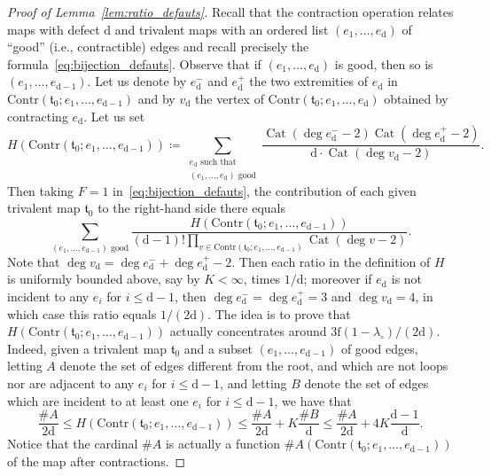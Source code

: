 \documentclass[11pt]{article}
\newcommand{\ie}{i.e.,\xspace}
\DeclareMathOperator{\Cat}{Cat}
\theoremstyle{plain}
\theoremstyle{definition}
\theoremstyle{remark}
\newcommand{\face}{\mathrm{f}}
\newcommand{\defect}{\mathrm{d}}
\begin{document}
\begin{proof}[Proof of Lemma~\ref{lem:ratio_defauts}]
Recall that the contraction operation relates maps with defect $\defect$ and trivalent maps with an ordered list $(e_1, \dots, e_\defect)$ of ``good'' (\ie contractible) edges and recall precisely the formula~\eqref{eq:bijection_defauts}.
Observe that if $(e_1, \dots, e_\defect)$ is good, then so is $(e_1, \dots, e_{\defect-1})$. Let us denote by $e_\defect^-$ and $e_\defect^+$ the two extremities of $e_\defect$ in $\mathrm{Contr}(\mathfrak{t}_0 ; e_1, \dots, e_{\defect-1})$ and by $v_\defect$ the vertex of $\mathrm{Contr}(\mathfrak{t}_0 ; e_1, \dots, e_\defect)$ obtained by contracting $e_\defect$.
Let us set
\[
H(\mathrm{Contr}(\mathfrak{t}_0 ; e_1, \dots, e_{ \defect-1}))
\coloneqq \sum_{\substack{e_\defect \text{ such that}\\ (e_1, \dots, e_\defect) \text{ good}}} \frac{\Cat(\deg e_\defect^- - 2) \Cat(\deg e_\defect^+ - 2)}{\defect\cdot\Cat(\deg v_\defect - 2)}.
\]
Then taking $F=1$ in~\eqref{eq:bijection_defauts}, the contribution of each given trivalent map $\mathfrak{t}_0$ to the right-hand side there equals
\[
\sum_{(e_1, \dots, e_{\defect-1}) \text{ good}} \frac{H(\mathrm{Contr}(\mathfrak{t}_0 ; e_1, \dots, e_{ \defect-1}))}{(\defect-1)! \prod_{v \in \mathrm{Contr}(\mathfrak{t}_0 ; e_1, \dots, e_{\defect-1})} \Cat(\deg v - 2)}.
\]
Note that $\deg v_\defect = \deg e_\defect^- + \deg e_\defect^+ - 2$. Then each ratio in the definition of $H$ is uniformly bounded above, say by $K < \infty$, times $1/\defect$; moreover if $e_\defect$ is not incident to any $e_i$ for $i \le \defect-1$, then $\deg e_\defect^- = \deg e_\defect^+ = 3$ and $\deg v_\defect = 4$, in which case this ratio equals $1/(2\defect)$. The idea is to prove that $H(\mathrm{Contr}(\mathfrak{t}_0 ; e_1, \dots, e_{ \defect-1}))$ actually concentrates around $3\face(1-\lambda_\circ) / (2\defect)$. Indeed, given a trivalent map $\mathfrak{t}_0$ and a subset $(e_1, \dots, e_{\defect-1})$ of good edges, letting $A$ denote the set of edges different from the root, and which are not loops nor are adjacent to any $e_i$ for $i \le \defect-1$, and letting $B$ denote the set of edges which are incident to at least one $e_i$ for $i \le \defect-1$,
we have that
\[
\frac{\# A}{2\defect}
\le H(\mathrm{Contr}(\mathfrak{t}_0 ; e_1, \dots, e_{ \defect-1}))
\le \frac{\# A}{2\defect} + K \frac{\# B}{\defect}
\le \frac{\# A}{2\defect} + 4 K \frac{\defect-1}{\defect}.
\]
Notice that the cardinal $\#A$ is actually a function $\#A(\mathrm{Contr}(\mathfrak{t}_0 ; e_1, \dots, e_{ \defect-1}))$ of the map after contractions.

\end{proof}
\end{document}

